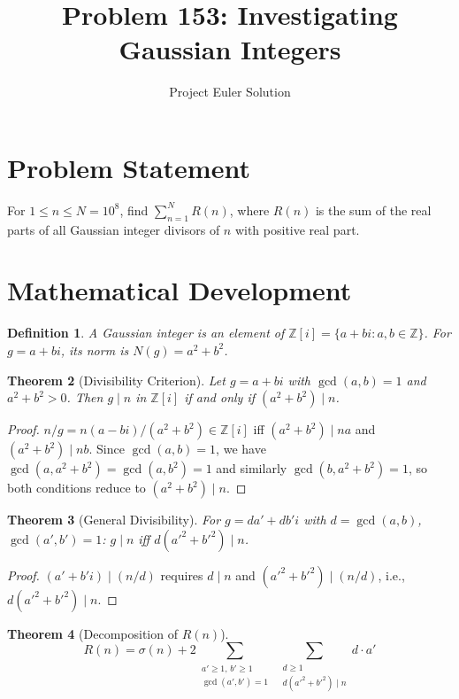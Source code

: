 \documentclass[12pt]{article}
\title{Problem 153: Investigating Gaussian Integers}
\author{Project Euler Solution}
\date{}
\newtheorem{theorem}{Theorem}
\newtheorem{definition}[theorem]{Definition}
\begin{document}
\maketitle

\section{Problem Statement}

For $1 \le n \le N = 10^8$, find $\displaystyle\sum_{n=1}^{N} R(n)$, where $R(n)$ is the sum of the real parts of all Gaussian integer divisors of $n$ with positive real part.

\section{Mathematical Development}

\begin{definition}
A \emph{Gaussian integer} is an element of $\mathbb{Z}[i] = \{a+bi : a,b \in \mathbb{Z}\}$. For $g = a+bi$, its \emph{norm} is $N(g) = a^2+b^2$.
\end{definition}

\begin{theorem}[Divisibility Criterion]
\label{thm:div}
Let $g = a+bi$ with $\gcd(a,b)=1$ and $a^2+b^2>0$. Then $g \mid n$ in $\mathbb{Z}[i]$ if and only if $(a^2+b^2) \mid n$.
\end{theorem}

\begin{proof}
$n/g = n(a-bi)/(a^2+b^2) \in \mathbb{Z}[i]$ iff $(a^2+b^2) \mid na$ and $(a^2+b^2) \mid nb$. Since $\gcd(a,b)=1$, we have $\gcd(a, a^2+b^2) = \gcd(a, b^2) = 1$ and similarly $\gcd(b, a^2+b^2) = 1$, so both conditions reduce to $(a^2+b^2) \mid n$.
\end{proof}

\begin{theorem}[General Divisibility]
For $g = da'+db'i$ with $d = \gcd(a,b)$, $\gcd(a',b')=1$: $g \mid n$ iff $d(a'^2+b'^2) \mid n$.
\end{theorem}

\begin{proof}
$(a'+b'i) \mid (n/d)$ requires $d \mid n$ and $(a'^2+b'^2) \mid (n/d)$, i.e., $d(a'^2+b'^2) \mid n$.
\end{proof}

\begin{theorem}[Decomposition of $R(n)$]
\[
R(n) = \sigma(n) + 2 \sum_{\substack{a' \ge 1,\, b' \ge 1 \\ \gcd(a',b')=1}} \;\sum_{\substack{d \ge 1 \\ d(a'^2+b'^2) \mid n}} d \cdot a'
\]
\end{theorem}
\end{document}
